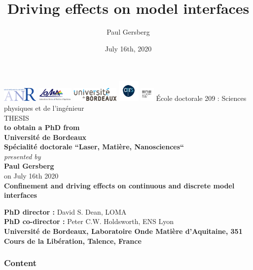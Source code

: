 \documentclass[9pt, dvipsnames]{beamer} %
\date{July 16th, 2020}
\author{Paul Gersberg}
\title{Driving effects on model interfaces}
\begin{document}
    \everymath{\displaystyle}

\begin{frame}
    \centering
    \includegraphics[height=20pt]{anr.png}
    \hfill 
    \includegraphics[height=20pt]{loma.png}      
    \hfill
    \includegraphics[height=20pt]{u-bordeaux.png}           
    \hfill
    \includegraphics[height=30pt]{cnrs.png}
    \hfill
    \includegraphics[height=20pt]{logo_ENS.jpg}        
    \vfill
    {École doctorale 209 : Sciences physiques et de l'ingénieur}\\
    \vfill
    { THESIS}\\
    {\bfseries \scriptsize to obtain a PhD from}\\
    {\bfseries Université de Bordeaux}\\
    {{\bfseries Spécialité doctorale ``Laser, Matière, Nanosciences``}}\\
    \textit{\scriptsize presented by }\\
    {{\Large \bfseries Paul Gersberg}} \\
    {\scriptsize on July 16th 2020} \\
    \vfill
    {\huge \color[rgb]{0,0,1} \bfseries{Confinement and driving effects on continuous and discrete model interfaces}} \\
    \vfill
    \raggedright
    {\bf PhD director :} David S. Dean, LOMA \\
    {\bf PhD co-director :} Peter C.W. Holdsworth, ENS Lyon \\
    \textbf{\scriptsize Université de Bordeaux, Laboratoire Onde Matière d'Aquitaine, 351 Cours de la Libération, Talence, France}

\end{frame}

\begin{frame}
    \frametitle{Content}
    \tableofcontents
\end{frame}
\end{document}
